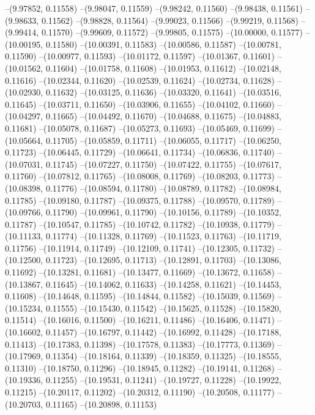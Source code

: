 --(9.97852, 0.11558)
--(9.98047, 0.11559)
--(9.98242, 0.11560)
--(9.98438, 0.11561)
--(9.98633, 0.11562)
--(9.98828, 0.11564)
--(9.99023, 0.11566)
--(9.99219, 0.11568)
--(9.99414, 0.11570)
--(9.99609, 0.11572)
--(9.99805, 0.11575)
--(10.00000, 0.11577)
--(10.00195, 0.11580)
--(10.00391, 0.11583)
--(10.00586, 0.11587)
--(10.00781, 0.11590)
--(10.00977, 0.11593)
--(10.01172, 0.11597)
--(10.01367, 0.11601)
--(10.01562, 0.11604)
--(10.01758, 0.11608)
--(10.01953, 0.11612)
--(10.02148, 0.11616)
--(10.02344, 0.11620)
--(10.02539, 0.11624)
--(10.02734, 0.11628)
--(10.02930, 0.11632)
--(10.03125, 0.11636)
--(10.03320, 0.11641)
--(10.03516, 0.11645)
--(10.03711, 0.11650)
--(10.03906, 0.11655)
--(10.04102, 0.11660)
--(10.04297, 0.11665)
--(10.04492, 0.11670)
--(10.04688, 0.11675)
--(10.04883, 0.11681)
--(10.05078, 0.11687)
--(10.05273, 0.11693)
--(10.05469, 0.11699)
--(10.05664, 0.11705)
--(10.05859, 0.11711)
--(10.06055, 0.11717)
--(10.06250, 0.11723)
--(10.06445, 0.11729)
--(10.06641, 0.11734)
--(10.06836, 0.11740)
--(10.07031, 0.11745)
--(10.07227, 0.11750)
--(10.07422, 0.11755)
--(10.07617, 0.11760)
--(10.07812, 0.11765)
--(10.08008, 0.11769)
--(10.08203, 0.11773)
--(10.08398, 0.11776)
--(10.08594, 0.11780)
--(10.08789, 0.11782)
--(10.08984, 0.11785)
--(10.09180, 0.11787)
--(10.09375, 0.11788)
--(10.09570, 0.11789)
--(10.09766, 0.11790)
--(10.09961, 0.11790)
--(10.10156, 0.11789)
--(10.10352, 0.11787)
--(10.10547, 0.11785)
--(10.10742, 0.11782)
--(10.10938, 0.11779)
--(10.11133, 0.11774)
--(10.11328, 0.11769)
--(10.11523, 0.11763)
--(10.11719, 0.11756)
--(10.11914, 0.11749)
--(10.12109, 0.11741)
--(10.12305, 0.11732)
--(10.12500, 0.11723)
--(10.12695, 0.11713)
--(10.12891, 0.11703)
--(10.13086, 0.11692)
--(10.13281, 0.11681)
--(10.13477, 0.11669)
--(10.13672, 0.11658)
--(10.13867, 0.11645)
--(10.14062, 0.11633)
--(10.14258, 0.11621)
--(10.14453, 0.11608)
--(10.14648, 0.11595)
--(10.14844, 0.11582)
--(10.15039, 0.11569)
--(10.15234, 0.11555)
--(10.15430, 0.11542)
--(10.15625, 0.11528)
--(10.15820, 0.11514)
--(10.16016, 0.11500)
--(10.16211, 0.11486)
--(10.16406, 0.11471)
--(10.16602, 0.11457)
--(10.16797, 0.11442)
--(10.16992, 0.11428)
--(10.17188, 0.11413)
--(10.17383, 0.11398)
--(10.17578, 0.11383)
--(10.17773, 0.11369)
--(10.17969, 0.11354)
--(10.18164, 0.11339)
--(10.18359, 0.11325)
--(10.18555, 0.11310)
--(10.18750, 0.11296)
--(10.18945, 0.11282)
--(10.19141, 0.11268)
--(10.19336, 0.11255)
--(10.19531, 0.11241)
--(10.19727, 0.11228)
--(10.19922, 0.11215)
--(10.20117, 0.11202)
--(10.20312, 0.11190)
--(10.20508, 0.11177)
--(10.20703, 0.11165)
--(10.20898, 0.11153)
